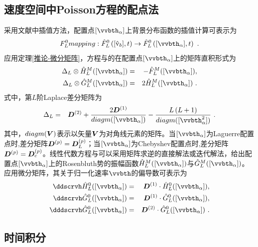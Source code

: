   \subsection{速度空间中Poisson方程的配点法}

  采用文献\cite{Weideman2000}中插值方法，配置点$[\vvbth_{\alpha}]$上背景分布函数的插值计算可表示为
  \begin{eqnarray}
      F_L^0 mapping:\FhL \left([\rmvhb],t \right) \to \FhL \left([\vvbth_{\alpha}],t \right)
      ~. \label{FL0mapping}          
  \end{eqnarray}
  应用定理\ref{推论-微分矩阵}，方程与的在配置点$[\vvbth_{\alpha}]$上的矩阵直积形式为
  \begin{eqnarray}
      \Delta_L \otimes \Hhlm ([\vvbth_{\alpha}]) &=& - \Fhlm([\vvbth_{\alpha}]) , \label{PoissonHhLMAMatrix} \\
      \Delta_L \otimes \Ghlm([\vvbth_{\alpha}]) &=& 2 \Hhlm([\vvbth_{\alpha}]) ~. \label{PoissonGhLMAMatrix}
  \end{eqnarray}
  式中，第$L$阶Laplace差分矩阵为
  \begin{eqnarray}
      \Delta_L &=& \bsD^{(2)} + \frac{2 \bsD^{(1)}}{diagm([\vvbth_{\alpha}])} - \frac{L \left(L + 1\right)}{diagm([\vvbth_{\alpha}^2])} ~. \label{PoissonGhLMA}
  \end{eqnarray}
  其中，$diagm(\boldsymbol{V})$表示以矢量$\boldsymbol{V}$为对角线元素的矩阵。当$[\vvbth_{\alpha}]$为Laguerre配置点时,差分矩阵$\boldsymbol{D}^{(p)}=\boldsymbol{D}_L^{(p)}$；当$[\vvbth_{\alpha}]$为Chebyshev配置点时,差分矩阵$\boldsymbol{D}^{(p)}=\boldsymbol{D}_c^{(p)}$。线性代数方程与可以采用矩阵求逆的直接解法或迭代解法，给出配置点$[\vvbth_{\alpha}]$上的Rosenbluth势的振幅函数$\Hhlm ([\vvbth_{\alpha}])$与$\Ghlm ([\vvbth_{\alpha}])$。应用微分矩阵，其关于归一化速率$\vvbth$的偏导数可表示为
   \begin{eqnarray}
        \ddscrvh \HhL([\vvbth_{\alpha}]) &=& \bsD^{(1)} \cdot \HhL([\vvbth_{\alpha}]),\label{ddvhHhlcheby}
        \\
        \ddscrvh \GhL([\vvbth_{\alpha}]) &=& \bsD^{(1)} \cdot \GhL([\vvbth_{\alpha}]),\label{ddvhGhlcheby}
        \\
        \dddscrvh \GhL([\vvbth_{\alpha}]) &=& \bsD^{(2)} \cdot \GhL([\vvbth_{\alpha}]) ~. \label{dddvhGhlcheby}
   \end{eqnarray}
  
  \subsection{时间积分}

